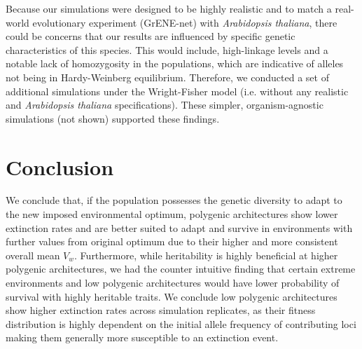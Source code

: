 \documentclass{article}
\begin{document}
Because our simulations were designed to be highly realistic and to match a real-world evolutionary experiment (GrENE-net) with \textit{Arabidopsis thaliana}, there could be concerns that our results are influenced by specific genetic characteristics of this species. This would include, high-linkage levels and a notable lack of homozygosity in the populations, which are indicative of alleles not being in Hardy-Weinberg equilibrium. Therefore, we conducted a set of additional simulations under the Wright-Fisher model (i.e. without any realistic and  \textit{Arabidopsis thaliana} specifications). These simpler, organism-agnostic simulations (not shown) supported these findings. 

\section{Conclusion}
We conclude that, if the population possesses the genetic diversity to adapt to the new imposed environmental optimum, polygenic architectures show lower extinction rates and are better suited to adapt and survive in environments with further values from original optimum due to their higher and more consistent overall mean $V_w$. Furthermore, while heritability is highly beneficial at higher polygenic architectures, we had the counter intuitive finding that certain extreme environments and low polygenic architectures would have lower probability of survival with highly heritable traits. We conclude low polygenic architectures show higher extinction rates across simulation replicates, as their fitness distribution is highly dependent on the initial allele frequency of contributing loci making them generally more susceptible to an extinction event. 


\end{document}
